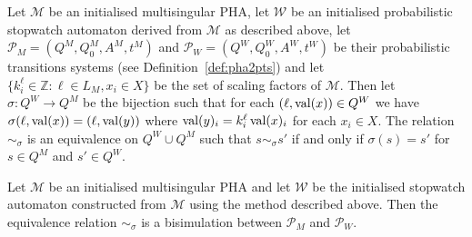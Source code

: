 \begin{defi}[[Equivalence between $\mathcal{W}$ and $\mathcal{M}$ \cite{Henzinger1995}]
Let $\mathcal{M}$ be an initialised multisingular PHA, let $\mathcal{W}$ be an initialised probabilistic stopwatch automaton derived from $\mathcal{M}$ as described above, let
 $\mathcal{P}_{M}=(Q^{M},Q^{M}_{0},A^{M},t^{M})$ and
 $\mathcal{P}_{W}=(Q^{W},Q^{W}_{0},A^{W},t^{W})$ be their probabilistic transitions systems (see Definition~\ref{def:pha2pts}) and let $\{k_{i}^{\ell}\in\mathbb{Z} : \ell\in L_{M}, x_{i}\in X\}$ be the set of scaling factors of $\mathcal{M}$. Then let $\sigma : Q^{W} \rightarrow Q^{M}$ be the
 bijection such that for each $(\ell, \operatorname{val}(x))\in Q^{W}$ we have $\sigma(\ell,\operatorname{val}(x))=(\ell,\operatorname{val}(y))$ where $\operatorname{val}(y)_{i} = k_{i}^{\ell}\operatorname{val}(x)_{i}$ for each $x_{i}\in X$.
 The relation $\sim_{\sigma}$ is an equivalence on $Q^{W}\cup Q^{M}$ such that $s\sim_{\sigma}s'$ if and only if $\sigma(s)=s'$ for $s\in Q^{M}$ and $s'\in Q^{W}$.
\end{defi}

\begin{prop}
Let $\mathcal{M}$ be an initialised multisingular PHA and let $\mathcal{W}$ be the initialised stopwatch automaton constructed from $\mathcal{M}$ using the method described above. Then the equivalence relation $\sim_{\sigma}$ is a bisimulation between $\mathcal{P}_{M}$ and $\mathcal{P}_{W}$.
\end{prop}


